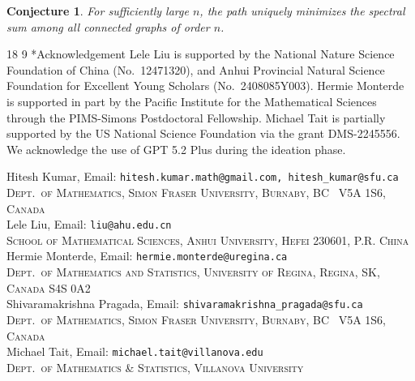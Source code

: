 \documentclass[11pt]{article}
\makeatletter
\renewcommand\section{\@startsection{section}{1}{\z@}%
{18\p@ \@plus 6\p@ \@minus 3\p@}%
{9\p@ \@plus 6\p@ \@minus 3\p@}%
{\large\bfseries\boldmath}}
\theoremstyle{plain}
\newtheorem{conjecture}[theorem]{Conjecture}
\theoremstyle{definition}
\newcommand{\affl}[3]{\noindent #1, Email: {\tt #2}\\ \textsc{#3}\\[1.5pt]}
\numberwithin{equation}{section}
\makeatother
\begin{document}
\begin{conjecture} 
For sufficiently large $n$, the path uniquely minimizes the spectral 
sum among all connected graphs of order $n$.
\end{conjecture}

\section*{Acknowledgement}
Lele Liu is supported by the National Nature Science Foundation of China (No.\ 12471320), 
and Anhui Provincial Natural Science Foundation for Excellent Young Scholars (No.\ 2408085Y003). 
Hermie Monterde is supported in part by the Pacific Institute for the Mathematical Sciences through 
the PIMS-Simons Postdoctoral Fellowship. Michael Tait is partially supported by the US National 
Science Foundation via the grant DMS-2245556. We acknowledge the use of GPT 5.2 Plus during the ideation phase. 




\vspace{0.4cm}

\affl{Hitesh Kumar}{hitesh.kumar.math@gmail.com, hitesh\_kumar@sfu.ca}{Dept.\ of Mathematics, Simon Fraser University, Burnaby, BC \ V5A 1S6, Canada}

\affl{Lele Liu}{liu@ahu.edu.cn}{School of Mathematical Sciences, Anhui University, Hefei 230601, 
P.R. China}

\affl{Hermie Monterde}{hermie.monterde@uregina.ca}{Dept.\ of Mathematics and Statistics, University of Regina, Regina, SK, Canada S4S 0A2}

\affl{Shivaramakrishna Pragada}{shivaramakrishna\_pragada@sfu.ca}{Dept.\ of Mathematics, Simon Fraser University, Burnaby, BC \ V5A 1S6, Canada}

\affl{Michael Tait}{michael.tait@villanova.edu}{Dept.\ of Mathematics \& Statistics, Villanova University}

\newpage
\end{document}
